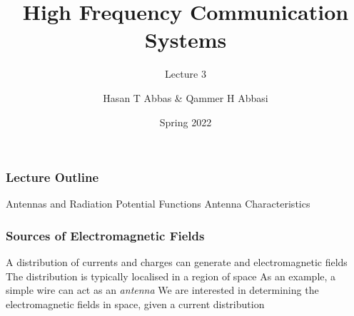 \documentclass[10pt, compress]{beamer}
\title{High Frequency Communication Systems}
\subtitle{Lecture 3}
\date{Spring 2022}
\author{Hasan T Abbas \& Qammer H Abbasi}
\begin{document}
\maketitle

\begin{frame}[fragile]
  \frametitle{Lecture Outline}
  \begin{outline}[itemize]
    \1 Antennas and Radiation
    \1 Potential Functions
    \1 Antenna Characteristics
  \end{outline}
\end{frame}
\begin{frame}[fragile]
  \frametitle{Sources of Electromagnetic Fields}
  \begin{outline}
    \1 A distribution of currents and charges can generate and \color{red}{radiate} electromagnetic fields
    \2 The distribution is typically localised in a region of space
    \2 As an example, a simple wire can act as an \textit{antenna}
    \1 We are interested in determining the electromagnetic fields in space, given a current distribution
  \end{outline}
\end{frame}
\end{document}
